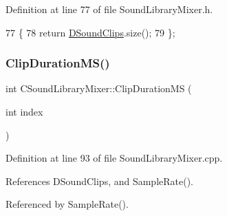 Definition at line 77 of file Sound\+Library\+Mixer.\+h.


\begin{DoxyCode}
77                              \{
78             \textcolor{keywordflow}{return} \hyperlink{classCSoundLibraryMixer_af4a006eacdcd590fad6e02cddaf197c2}{DSoundClips}.size();  
79         \};
\end{DoxyCode}
\hypertarget{classCSoundLibraryMixer_a0492c587cb62cd8945880a7de3dad490}{}\label{classCSoundLibraryMixer_a0492c587cb62cd8945880a7de3dad490} 
\subsubsection{\texorpdfstring{Clip\+Duration\+M\+S()}{ClipDurationMS()}}
{\footnotesize\ttfamily int C\+Sound\+Library\+Mixer\+::\+Clip\+Duration\+MS (\begin{DoxyParamCaption}\item[{int}]{index }\end{DoxyParamCaption})}



Definition at line 93 of file Sound\+Library\+Mixer.\+cpp.



References D\+Sound\+Clips, and Sample\+Rate().



Referenced by Sample\+Rate().


